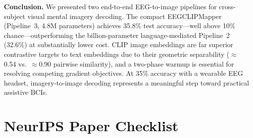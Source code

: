 \documentclass{article}
\begin{document}
\textbf{Conclusion.} We presented two end-to-end EEG-to-image pipelines for cross-subject visual mental imagery decoding. The compact EEGCLIPMapper (Pipeline~3, 4.8M parameters) achieves 35.8\% test accuracy---well above 10\% chance---outperforming the billion-parameter language-mediated Pipeline~2 (32.6\%) at substantially lower cost. CLIP image embeddings are far superior contrastive targets to text embeddings due to their geometric separability ($\approx$0.54 vs.\ $\approx$0.90 pairwise similarity), and a two-phase warmup is essential for resolving competing gradient objectives. At 35\% accuracy with a wearable EEG headset, imagery-to-image decoding represents a meaningful step toward practical assistive BCIs.





\newpage
\section*{NeurIPS Paper Checklist}
\end{document}
